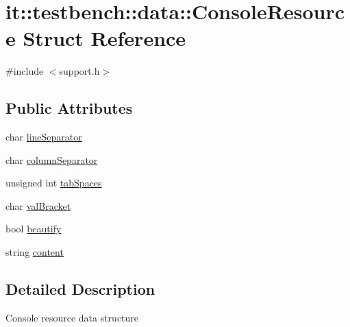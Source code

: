 \hypertarget{structit_1_1testbench_1_1data_1_1ConsoleResource}{\section{it\-:\-:testbench\-:\-:data\-:\-:Console\-Resource Struct Reference}
\label{de/d9c/structit_1_1testbench_1_1data_1_1ConsoleResource}
}


{\ttfamily \#include $<$support.\-h$>$}

\subsection*{Public Attributes}
\begin{DoxyCompactItemize}
\item 
char \hyperlink{structit_1_1testbench_1_1data_1_1ConsoleResource_a7272ac634ee6d69c0159dbf4c71fab95}{line\-Separator}
\item 
char \hyperlink{structit_1_1testbench_1_1data_1_1ConsoleResource_a15e4f2259df5082ace7db28fb8b990b7}{column\-Separator}
\item 
unsigned int \hyperlink{structit_1_1testbench_1_1data_1_1ConsoleResource_a09e1a6c33b421798b6b9518bae5b8e57}{tab\-Spaces}
\item 
char \hyperlink{structit_1_1testbench_1_1data_1_1ConsoleResource_ac936cfe9139cf5e05e292a1edf913cb6}{val\-Bracket}
\item 
bool \hyperlink{structit_1_1testbench_1_1data_1_1ConsoleResource_a79ece7f3ba43fd61b1988082bd305a18}{beautify}
\item 
string \hyperlink{structit_1_1testbench_1_1data_1_1ConsoleResource_a61b707de1ba1f3a875107306b9e17a44}{content}
\end{DoxyCompactItemize}


\subsection{Detailed Description}
Console resource data structure 

